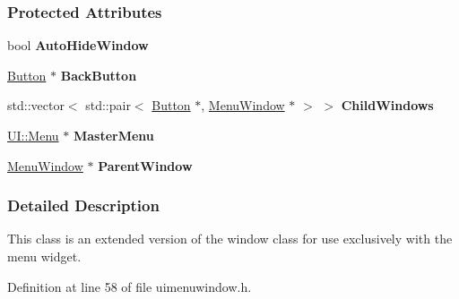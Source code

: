 \subsubsection*{Protected Attributes}
\begin{DoxyCompactItemize}
\item 
\hypertarget{classMezzanine_1_1UI_1_1MenuWindow_a2b6ae12c79b59f95f441bbe938517ec6}{
bool {\bfseries AutoHideWindow}}
\label{classMezzanine_1_1UI_1_1MenuWindow_a2b6ae12c79b59f95f441bbe938517ec6}

\item 
\hypertarget{classMezzanine_1_1UI_1_1MenuWindow_abf02d5129945bc0a8b9cc2b28843cff5}{
\hyperlink{classMezzanine_1_1UI_1_1Button}{Button} $\ast$ {\bfseries BackButton}}
\label{classMezzanine_1_1UI_1_1MenuWindow_abf02d5129945bc0a8b9cc2b28843cff5}

\item 
\hypertarget{classMezzanine_1_1UI_1_1MenuWindow_ab9c1010dd5bc91f3a09969d4ad33118b}{
std::vector$<$ std::pair$<$ \hyperlink{classMezzanine_1_1UI_1_1Button}{Button} $\ast$, \hyperlink{classMezzanine_1_1UI_1_1MenuWindow}{MenuWindow} $\ast$ $>$ $>$ {\bfseries ChildWindows}}
\label{classMezzanine_1_1UI_1_1MenuWindow_ab9c1010dd5bc91f3a09969d4ad33118b}

\item 
\hypertarget{classMezzanine_1_1UI_1_1MenuWindow_ae0e9b3d5e3611a572d9dc321f8399f2a}{
\hyperlink{classMezzanine_1_1UI_1_1Menu}{UI::Menu} $\ast$ {\bfseries MasterMenu}}
\label{classMezzanine_1_1UI_1_1MenuWindow_ae0e9b3d5e3611a572d9dc321f8399f2a}

\item 
\hypertarget{classMezzanine_1_1UI_1_1MenuWindow_af661be0bbaecc5e9975aae1664cd006a}{
\hyperlink{classMezzanine_1_1UI_1_1MenuWindow}{MenuWindow} $\ast$ {\bfseries ParentWindow}}
\label{classMezzanine_1_1UI_1_1MenuWindow_af661be0bbaecc5e9975aae1664cd006a}

\end{DoxyCompactItemize}


\subsubsection{Detailed Description}
This class is an extended version of the window class for use exclusively with the menu widget. 

Definition at line 58 of file uimenuwindow.h.



